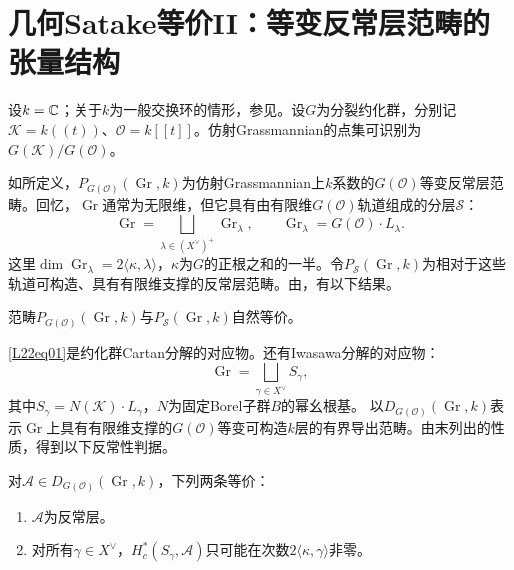 \chapter{几何Satake等价II：等变反常层范畴的张量结构}\label{L22}
设$k=\mathbb{C}$；关于$k$为一般交换环的情形，参见。设$G$为分裂约化群，分别记$\mathcal K=k((t))$、$\mathcal O=k[[t]]$。仿射Grassmannian的点集可识别为$G(\mathcal K)/G(\mathcal O)$。

如所定义，$P_{G(\mathcal O)}(\operatorname{Gr},k)$为仿射Grassmannian上$k$系数的$G(\mathcal O)$等变反常层范畴。回忆，$\operatorname{Gr}$通常为无限维，但它具有由有限维$G(\mathcal O)$轨道组成的分层$\mathcal S$：
\begin{equation}\tag{0.1}\label{L22eq01}\operatorname{Gr}=\bigsqcup_{\lambda\in(X^\vee)^+}\operatorname{Gr}_\lambda,\qquad\operatorname{Gr}_\lambda=G(\mathcal O)\cdot L_\lambda.\end{equation}
这里$\dim\operatorname{Gr}_\lambda=2\langle\kappa,\lambda\rangle$，$\kappa$为$G$的正根之和的一半。令$P_{\mathcal S}(\operatorname{Gr},k)$为相对于这些轨道可构造、具有有限维支撑的反常层范畴。由，有以下结果。
\begin{proposition}\label{L22S0O1}范畴$P_{G(\mathcal O)}(\operatorname{Gr},k)$与$P_{\mathcal S}(\operatorname{Gr},k)$自然等价。\end{proposition}
\eqref{L22eq01}是约化群Cartan分解的对应物。还有Iwasawa分解的对应物：
\begin{equation}\tag{0.2}\label{L22eq02}\operatorname{Gr}=\bigsqcup_{\gamma\in X^\vee}S_\gamma,\end{equation}
其中$S_\gamma=N(\mathcal K)\cdot L_\gamma$，$N$为固定Borel子群$B$的幂幺根基。
以$D_{G(\mathcal O)}(\operatorname{Gr},k)$表示$\operatorname{Gr}$上具有有限维支撑的$G(\mathcal O)$等变可构造$k$层的有界导出范畴。由末列出的性质，得到以下反常性判据。
\begin{lemma}\label{L22S0O2}对$\mathcal A\in D_{G(\mathcal O)}(\operatorname{Gr},k)$，下列两条等价：
\begin{enumerate}[label=(\roman*)]
\item $\mathcal A$为反常层。
\item 对所有$\gamma\in X^\vee$，$H_c^*(S_\gamma,\mathcal A)$只可能在次数$2\langle\kappa,\gamma\rangle$非零。
\end{enumerate}
\end{lemma}
